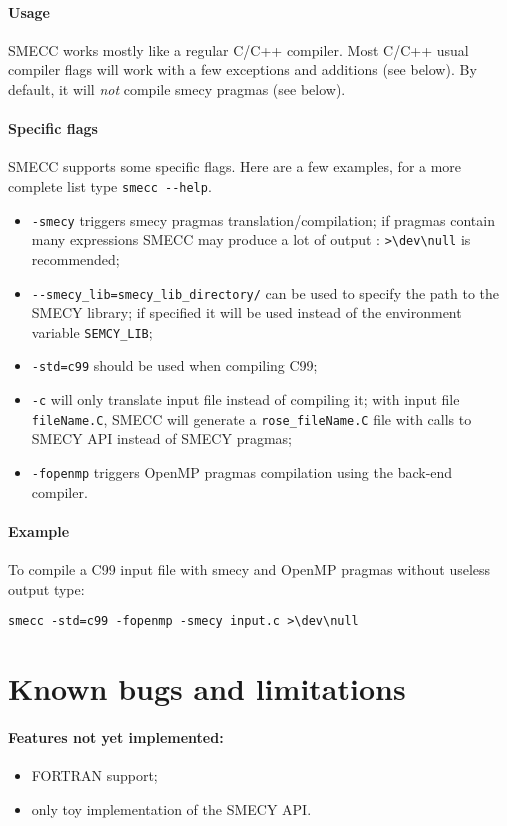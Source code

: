 \documentclass[a4paper,11pt]{article}
\newcommand{\scompiler}{SMECC }
\begin{document}
		\paragraph{Usage}
		\scompiler works mostly like a regular C/C++ compiler. Most C/C++ usual compiler flags will work with a few exceptions and additions (see below). By default, it will \emph{not} compile smecy pragmas (see below).

		\paragraph{Specific flags}
		\scompiler supports some specific flags. Here are a few examples, for a more complete list type \verb+smecc --help+.
		\begin{itemize}
			\item \verb+-smecy+ triggers smecy pragmas translation/compilation; if pragmas contain many expressions \scompiler may produce a lot of output : \verb+>\dev\null+ is recommended;
			\item \verb+--smecy_lib=smecy_lib_directory/+ can be used to specify the path to the SMECY library; if specified it will be used instead of the environment variable \verb+SEMCY_LIB+;
			\item \verb+-std=c99+ should be used when compiling C99;
			\item \verb+-c+ will only translate input file instead of compiling it; with input file \verb+fileName.C+, \scompiler will generate a \verb+rose_fileName.C+ file with calls to SMECY API instead of SMECY pragmas;
			\item \verb+-fopenmp+ triggers OpenMP pragmas compilation using the back-end compiler.
		\end{itemize}

		\paragraph{Example} To compile a C99 input file with smecy and OpenMP pragmas without useless output type:
\begin{verbatim}
smecc -std=c99 -fopenmp -smecy input.c >\dev\null
\end{verbatim}

	\section{Known bugs and limitations}

		\paragraph{Features not yet implemented:}
		\begin{itemize}
			\item FORTRAN support;
			\item only toy implementation of the SMECY API.
		\end{itemize}
\end{document}
